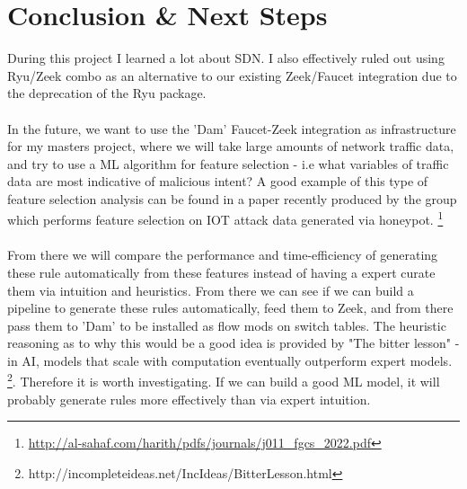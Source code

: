\documentclass{article}
\begin{document}
\section{Conclusion \& Next Steps}
During this project I learned a lot about SDN. I also effectively ruled out using Ryu/Zeek combo as an alternative to our existing Zeek/Faucet integration due to the deprecation of the Ryu package. 
\\
\\
In the future, we want to use the 'Dam' Faucet-Zeek integration as infrastructure for my masters project, where we will take large amounts of network traffic data, and try to use a ML algorithm for feature selection - i.e what variables of traffic data are most indicative of malicious intent? A good example of this type of feature selection analysis can be found in a paper recently produced by the group which performs feature selection on IOT attack data generated via honeypot. \footnote{\url{http://al-sahaf.com/harith/pdfs/journals/j011_fgcs_2022.pdf}}
\\
\\
From there we will compare the performance and time-efficiency of generating these rule automatically from these features instead of having a expert curate them via intuition and heuristics. From there we can see if we can build a pipeline to generate these rules automatically, feed them to Zeek, and from there pass them to 'Dam' to be installed as flow mods on switch tables. The heuristic reasoning as to why this would be a good idea is provided by "The bitter lesson" - in AI, models that scale with computation eventually outperform expert models. \footnote{http://incompleteideas.net/IncIdeas/BitterLesson.html}. Therefore it is worth investigating. If we can build a good ML model, it will probably generate rules more effectively than via expert intuition.   
\end{document}

